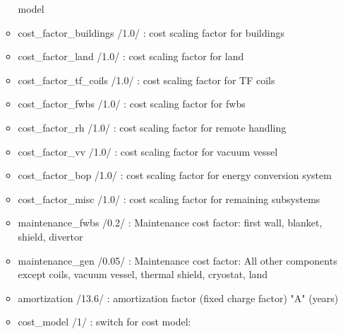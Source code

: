 \documentclass[
]{article}
\begin{document}
\begin{itemize}
\begin{itemize}
    model
  \item
    cost\_factor\_buildings /1.0/ : cost scaling factor for buildings
  \item
    cost\_factor\_land /1.0/ : cost scaling factor for land
  \item
    cost\_factor\_tf\_coils /1.0/ : cost scaling factor for TF coils
  \item
    cost\_factor\_fwbs /1.0/ : cost scaling factor for fwbs
  \item
    cost\_factor\_rh /1.0/ : cost scaling factor for remote handling
  \item
    cost\_factor\_vv /1.0/ : cost scaling factor for vacuum vessel
  \item
    cost\_factor\_bop /1.0/ : cost scaling factor for energy conversion
    system
  \item
    cost\_factor\_misc /1.0/ : cost scaling factor for remaining
    subsystems
  \item
    maintenance\_fwbs /0.2/ : Maintenance cost factor: first wall,
    blanket, shield, divertor
  \item
    maintenance\_gen /0.05/ : Maintenance cost factor: All other
    components except coils, vacuum vessel, thermal shield, cryostat,
    land
  \item
    amortization /13.6/ : amortization factor (fixed charge factor) "A"
    (years)
  \item
    cost\_model /1/ : switch for cost model:


\end{itemize}
\end{itemize}
\end{document}
